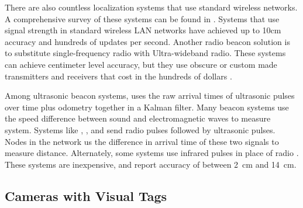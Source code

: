 \documentclass{article}
\begin{document}
    There are also countless localization systems that use standard wireless networks. A comprehensive survey of these systems can be found in \cite{liu_survey_2007}. Systems that use signal strength in standard wireless LAN networks have achieved up to 10\si{\centi\meter} accuracy and hundreds of updates per second. Another radio beacon solution is to substitute single-frequency radio with Ultra-wideband radio. These systems can achieve centimeter level accuracy, but they use obscure or custom made transmitters and receivers that cost in the hundreds of dollars \cite{zebra_dart_2017} \cite{pozyx_pozyx_2017}.

    Among ultrasonic beacon systems, \cite{kleeman_optimal_1992} uses the raw arrival times of ultrasonic pulses over time plus odometry together in a Kalman filter. Many beacon systems use the speed difference between sound and electromagnetic waves to measure system. Systems like \cite{smith_tracking_2004}, \cite{ward_new_1997}, and \cite{kim_advanced_2008} send radio pulses followed by ultrasonic pulses. Nodes in the network us the difference in arrival time of these two signals to measure distance. Alternately, some systems use infrared pulses in place of radio \cite{ghidary_new_1999} \cite{yucel_development_2012}. These systems are inexpensive, and report accuracy of between \SI{2}{\centi\meter} and \SI{14}{\centi\meter}.

  \subsection{Cameras with Visual Tags}
\end{document}
